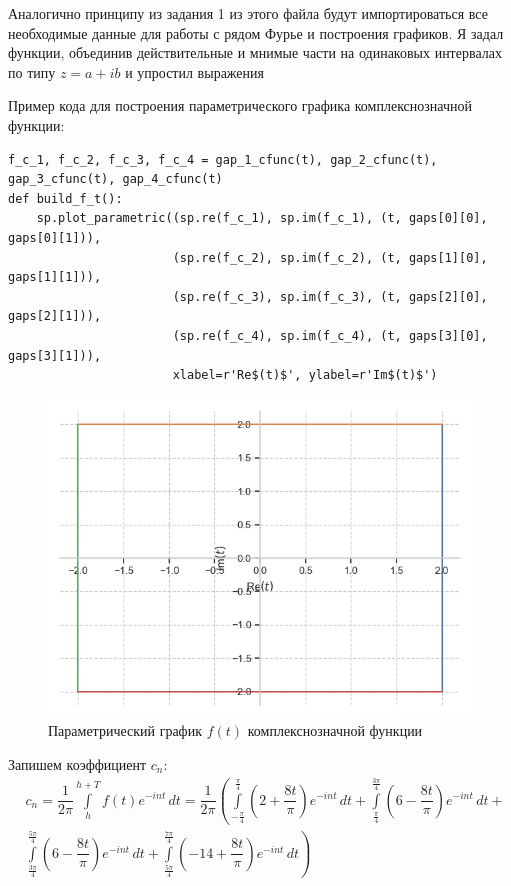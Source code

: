 \documentclass[a4paper, 16pt]{article}
\begin{document}
\noindent Аналогично принципу из задания 1 из этого файла будут импортироваться все
необходимые данные для работы с рядом Фурье и построения графиков. Я задал функции,
объединив действительные и мнимые части на одинаковых интервалах по типу $z=a+ib$ и
упростил выражения


\newpage
\noindent Пример кода для построения параметрического графика комплекснозначной функции:
\begin{lstlisting}[belowskip=-3mm]
f_c_1, f_c_2, f_c_3, f_c_4 = gap_1_cfunc(t), gap_2_cfunc(t), gap_3_cfunc(t), gap_4_cfunc(t)
def build_f_t():
    sp.plot_parametric((sp.re(f_c_1), sp.im(f_c_1), (t, gaps[0][0], gaps[0][1])),
                       (sp.re(f_c_2), sp.im(f_c_2), (t, gaps[1][0], gaps[1][1])),
                       (sp.re(f_c_3), sp.im(f_c_3), (t, gaps[2][0], gaps[2][1])),
                       (sp.re(f_c_4), sp.im(f_c_4), (t, gaps[3][0], gaps[3][1])), 
                       xlabel=r'Re$(t)$', ylabel=r'Im$(t)$')
\end{lstlisting}
\begin{figure}[!htb]
    \centering
    \includegraphics[scale=0.8]{cf(t).png}
    \captionsetup{skip=0pt}
    \caption{Параметрический график $f(t)$ комплекснозначной функции}
    \label{Рис:35}
\end{figure}


\noindent Запишем коэффициент $c_n$:
\begin{align*}
    & c_n =\dfrac{1}{2\pi}\int\limits_{h}^{h+T}f(t)e^{-int}\,dt=\dfrac{1}{2\pi}\left(\int\limits_{-\frac{\pi}{4}}^{\frac{\pi}{4}}\left(2+\dfrac{8t}{\pi}\right)e^{-int}\,dt+\int\limits_{\frac{\pi}{4}}^{\frac{3\pi}{4}}\left(6-\dfrac{8t}{\pi}\right)e^{-int}\,dt+\right.\\
    &\left. \int\limits_{\frac{3\pi}{4}}^{\frac{5\pi}{4}}\left(6-\dfrac{8t}{\pi}\right)e^{-int}\,dt+\int\limits_{\frac{5\pi}{4}}^{\frac{7\pi}{4}}\left(-14+\dfrac{8t}{\pi}\right)e^{-int}\,dt\right)
\end{align*}
\end{document}
